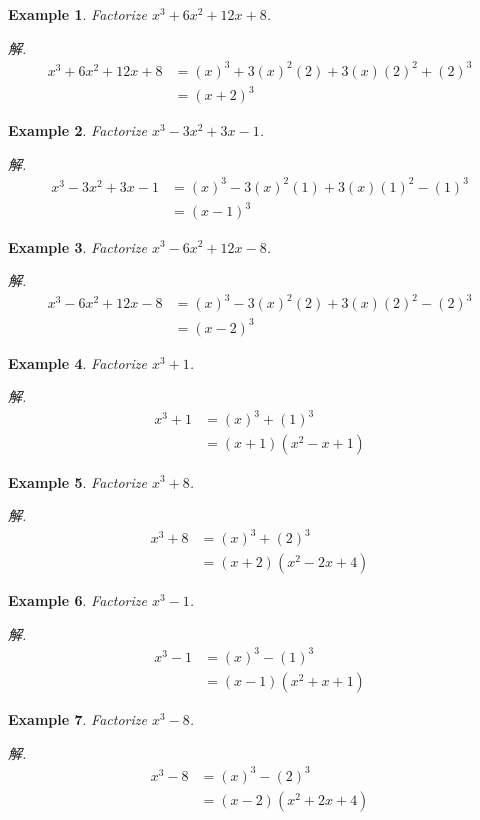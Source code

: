 \documentclass[12pt]{article}
\newtheorem{example}{Example}
\begin{document}
    \begin{example}
        Factorize $x^3+6x^2+12x+8$.
    \end{example}
    \textit{ 解. }\begin{align*}
        x^3+6x^2+12x+8&=(x)^3+3(x)^2(2)+3(x)(2)^2+(2)^3\\
        &=(x+2)^3
    \end{align*}

    \begin{example}
        Factorize $x^3-3x^2+3x-1$.
    \end{example}
    \textit{ 解. }\begin{align*}
        x^3-3x^2+3x-1&=(x)^3-3(x)^2(1)+3(x)(1)^2-(1)^3\\
        &=(x-1)^3
    \end{align*}

    \begin{example}
        Factorize $x^3-6x^2+12x-8$.
    \end{example}
    \textit{ 解. }\begin{align*}
        x^3-6x^2+12x-8&=(x)^3-3(x)^2(2)+3(x)(2)^2-(2)^3\\
        &=(x-2)^3
    \end{align*}

    \begin{example}
        Factorize $x^3+1$.
    \end{example}
    \textit{ 解. }\begin{align*}
        x^3+1&=(x)^3+(1)^3\\
        &=(x+1)(x^2-x+1)
    \end{align*}

    \begin{example}
        Factorize $x^3+8$.
    \end{example}
    \textit{ 解. }\begin{align*}
        x^3+8&=(x)^3+(2)^3\\
        &=(x+2)(x^2-2x+4)
    \end{align*}

    \begin{example}
        Factorize $x^3-1$.
    \end{example}
    \textit{ 解. }\begin{align*}
        x^3-1&=(x)^3-(1)^3\\
        &=(x-1)(x^2+x+1)
    \end{align*}

    \begin{example}
        Factorize $x^3-8$.
    \end{example}
    \textit{ 解. }\begin{align*}
        x^3-8&=(x)^3-(2)^3\\
        &=(x-2)(x^2+2x+4)
    \end{align*}
\end{document}
